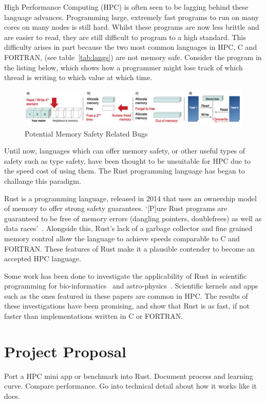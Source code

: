 \documentclass{article}[a4]
\begin{document}
High Performance Computing (HPC) is often seen to be lagging behind these language advances. Programming large, extremely fast programs to run on many cores on many nodes is still hard. Whilst these programs are now less brittle and are easier to read, they are still difficult to program to a high standard. This difficulty arises in part because the two most common languages in HPC, C and FORTRAN, (see table~\ref{tab:langs}) are not memory safe. Consider the program in the listing below, which shows how a programmer might lose track of which thread is writing to which value at which time.

\begin{figure}
  \centering
  \includegraphics[width=\linewidth]{figures/memory-safety.png}
  \caption{Potential Memory Safety Related Bugs~\cite{blanco-cuaresma_bolmont_2016}}
  \label{fig:mem}
\end{figure}

Until now, languages which can offer memory safety, or other useful types of safety such as type safety, have been thought to be unsuitable for HPC due to the speed cost of using them. The Rust programming language has began to challange this paradigm.

Rust is a programming language, released in 2014 that uses an ownership model of memory to offer strong safety guarantees. `[P]ure Rust programs are guaranteed to be free of memory errors (dangling pointers, doublefrees) as well as data races'~\cite{Matsakis:2014}. Alongside this, Rust's lack of a garbage collector and fine grained memory control allow the language to achieve speeds comparable to C and FORTRAN. These features of Rust make it a plausible contender to become an accepted HPC language.

Some work has been done to investigate the applicability of Rust in scientific programming for bio-informatics~\cite{bioinformatics} and astro-physics~\cite{blanco-cuaresma_bolmont_2016}. Scientific kernels and apps such as the ones featured in these papers are common in HPC. The results of these investigations have been promising, and show that Rust is as fast, if not faster than implementations written in C or FORTRAN.

\section{Project Proposal} %
Port a HPC mini app or benchmark into Rust. Document process and learning curve. Compare performance. Go into technical detail about how it works like it does.
\end{document}
